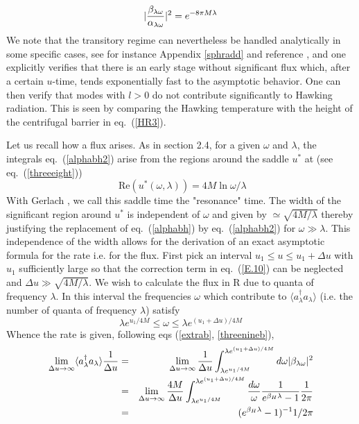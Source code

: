 \documentclass[12pt,oneside]{report}
\def\om{\omega	}
\def\la{\lambda}
\begin{document}
\begin{equation}
\vert {\beta_{\la \om} \over \alpha_{\la \om}} 
\vert ^2 = e^{-8\pi M \lambda}
\label{alphabh2B}
\end{equation}
We note that the transitory regime can nevertheless be handled
 analytically in
some specific cases,
see for instance Appendix \ref{sphradd} and reference
\cite{MaPa}, and one explicitly verifies that there
is an early stage without significant flux which, after  a certain $u$-time, tends
exponentially fast to the asymptotic behavior.
One can then verify that modes with $l>0$ do not contribute significantly 
to Hawking radiation. This is seen by comparing the Hawking temperature with the
height of the centrifugal barrier in eq.~(\ref{HR3}).

Let us recall how a flux arises.
As in section 2.4, 
for a given $ \omega$ and $
\lambda$, the integrals eq.~(\ref{alphabh2}) arise from
the regions around the saddle $u^*$ at (see eq.~(\ref{threeeight}))
\begin{equation}
\mbox{ Re}(u^*(\omega, \lambda))
= 4M \ln \omega/\lambda
\label{reson}
\end{equation}
With Gerlach \cite{Gerl}, we call this saddle time the "resonance" time. 
The width of the significant region around
$u^*$ is independent of $ \omega $ and given by $\simeq \sqrt{4 M / \lambda}$
thereby justifying the replacement 
of eq.~(\ref{alphabh}) by eq.~(\ref{alphabh2}) for $\om \gg  \la$.
This independence of the width allows for the derivation of an exact
asymptotic formula for the rate i.e.  for the flux. First pick an
interval $ u_1  \leq u \leq
u_1 + \Delta u $ with $ u_1$ sufficiently large so that the 
correction term in eq.~(\ref{E.10}) can be neglected
and $\Delta u \gg  \sqrt{4 M /
\lambda}$.  We
wish to calculate the flux in R due to quanta of frequency $\lambda$. In this
interval the frequencies $\omega$ which contribute to 
$\langle a^\dagger_\la a_\la \rangle $ (i.e. the  number of quanta of frequency
$\lambda$) satisfy
\begin{equation}
\lambda e^{u_1/4M} \leq \omega \leq \lambda
e^{(u_1+\Delta u) /4M}
\label{reson2}
\end{equation}
 Whence the rate is given, following eqs (\ref{extrab}, \ref{threenineb}), 
\begin {eqnarray}
\lim_{\Delta u \to \infty} 
\langle a^\dagger_\la a_\la \rangle{1 \over \Delta u}  &=&
\lim_{\Delta u \to \infty}
{1 \over \Delta u} \int_{\lambda e^{u_1/4M}}^{\lambda e^
{(u_1+\Delta u) /4M}} d\omega \vert \beta_{\la \om} \vert ^2 \nonumber\\
&=&
\lim_{\Delta u \to \infty} 
{4M \over \Delta u} \int_{\lambda e^{u_1/4M}}^{\lambda e^
{(u_1+\Delta u) /4M}} {d\omega \over \omega}  
{1 \over e^{\beta_H \lambda}-1} { 1
\over 2 \pi }\nonumber\\
&=& (e^{\beta_H \lambda}-1)^{-1} {1 /2 \pi}
\label {1.36}
\end {eqnarray}
\end{document}
